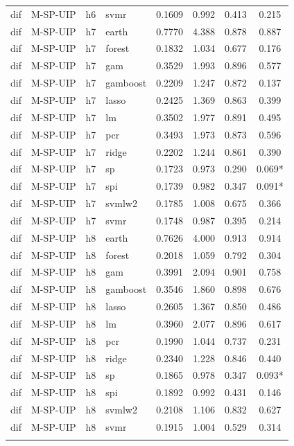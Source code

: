 \begin{ThreePartTable}
\begin{longtable}[t]{llclcccc}
dif & M-SP-UIP & h6 & svmr & 0.1609 & 0.992 & 0.413 & 0.215\\
\addlinespace
dif & M-SP-UIP & h7 & earth & 0.7770 & 4.388 & 0.878 & 0.887\\
dif & M-SP-UIP & h7 & forest & 0.1832 & 1.034 & 0.677 & 0.176\\
dif & M-SP-UIP & h7 & gam & 0.3529 & 1.993 & 0.896 & 0.577\\
dif & M-SP-UIP & h7 & gamboost & 0.2209 & 1.247 & 0.872 & 0.137\\
dif & M-SP-UIP & h7 & lasso & 0.2425 & 1.369 & 0.863 & 0.399\\
dif & M-SP-UIP & h7 & lm & 0.3502 & 1.977 & 0.891 & 0.495\\
dif & M-SP-UIP & h7 & pcr & 0.3493 & 1.973 & 0.873 & 0.596\\
dif & M-SP-UIP & h7 & ridge & 0.2202 & 1.244 & 0.861 & 0.390\\
dif & M-SP-UIP & h7 & sp & 0.1723 & 0.973 & 0.290 & 0.069*\\
dif & M-SP-UIP & h7 & spi & 0.1739 & 0.982 & 0.347 & 0.091*\\
dif & M-SP-UIP & h7 & svmlw2 & 0.1785 & 1.008 & 0.675 & 0.366\\
dif & M-SP-UIP & h7 & svmr & 0.1748 & 0.987 & 0.395 & 0.214\\
\addlinespace
dif & M-SP-UIP & h8 & earth & 0.7626 & 4.000 & 0.913 & 0.914\\
dif & M-SP-UIP & h8 & forest & 0.2018 & 1.059 & 0.792 & 0.304\\
dif & M-SP-UIP & h8 & gam & 0.3991 & 2.094 & 0.901 & 0.758\\
dif & M-SP-UIP & h8 & gamboost & 0.3546 & 1.860 & 0.898 & 0.676\\
dif & M-SP-UIP & h8 & lasso & 0.2605 & 1.367 & 0.850 & 0.486\\
dif & M-SP-UIP & h8 & lm & 0.3960 & 2.077 & 0.896 & 0.617\\
dif & M-SP-UIP & h8 & pcr & 0.1990 & 1.044 & 0.737 & 0.231\\
dif & M-SP-UIP & h8 & ridge & 0.2340 & 1.228 & 0.846 & 0.440\\
dif & M-SP-UIP & h8 & sp & 0.1865 & 0.978 & 0.347 & 0.093*\\
dif & M-SP-UIP & h8 & spi & 0.1892 & 0.992 & 0.431 & 0.146\\
dif & M-SP-UIP & h8 & svmlw2 & 0.2108 & 1.106 & 0.832 & 0.627\\
dif & M-SP-UIP & h8 & svmr & 0.1915 & 1.004 & 0.529 & 0.314\\
\addlinespace

\end{longtable}
\end{ThreePartTable}
